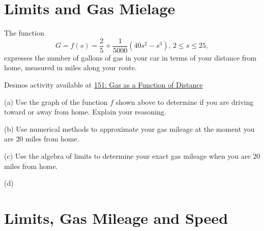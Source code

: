 \documentclass{ximera}
\begin{document}
\section{Limits and Gas Mielage}
\begin{example} \label{Ex:9sd8gfs}
The function 
\[
   G = f(s) = \frac{2}{5} +\frac{1}{5000}(40s^2 - s^3) , \, 2\leq s \leq 25 ,
\]
expresses the number of gallons of gas in your car in terms of your distance from home, measured in miles along your route. 

\begin{onlineOnly}
    \begin{center}
\end{center}
\end{onlineOnly}

Desmos activity available at
\href{https://www.desmos.com/calculator/wu6faygc05}{151: Gas as a Function of Distance}


(a) Use the graph of the function $f$ shown above to determine if you are driving toward or away from home. Explain your reasoning.

(b) Use numerical methods to approximate your gas mileage at the moment you are $20$ miles from home.

(c) Use the algebra of limits to determine your exact gas mileage when you are $20$ miles from home.

(d) 


\end{example}



\section{Limits, Gas Mileage and Speed}
\end{document}

